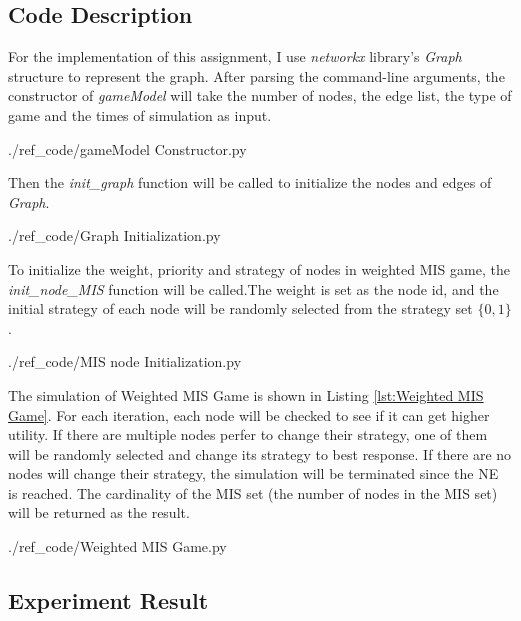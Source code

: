 \documentclass[a4paper, oneside, final, 12pt]{scrartcl} %
\begin{document}
\subsection{Code Description}

For the implementation of this assignment, I use \emph{networkx} library's \emph{Graph}
structure to represent the graph.
After parsing the command-line arguments, 
the constructor of \emph{gameModel} will take the number of nodes, 
the edge list, the type of game and the times of simulation as input.


                  {./ref_code/gameModel Constructor.py}

Then the \emph{init\_graph} function will be called to 
initialize the nodes and edges of \emph{Graph}.


                  {./ref_code/Graph Initialization.py}

To initialize the weight, priority and strategy of nodes in weighted MIS game, 
the \emph{init\_node\_MIS} function will be called.The weight is set as the node id, 
and the initial strategy of each node will be randomly
selected from the strategy set $\{0, 1\}$.


                {./ref_code/MIS node Initialization.py}

The simulation of Weighted MIS Game is shown in Listing \ref{lst:Weighted MIS Game}.
For each iteration, each node will be checked to see 
if it can get higher utility.
If there are multiple nodes perfer to change their strategy,
one of them will be randomly selected and change its strategy to best response.
If there are no nodes will change their strategy, 
the simulation will be terminated since the NE is reached.
The cardinality of the MIS set (the number of nodes in the MIS set) 
will be returned as the result.


                {./ref_code/Weighted MIS Game.py}

\subsection{Experiment Result}
\end{document}
